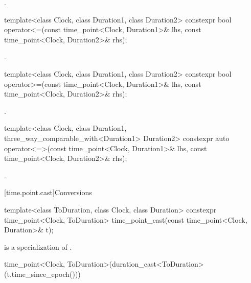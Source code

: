 \begin{itemdescr}
\pnum
\returns
{}.
\end{itemdescr}

%
\begin{itemdecl}
template<class Clock, class Duration1, class Duration2>
  constexpr bool operator<=(const time_point<Clock, Duration1>& lhs,
                            const time_point<Clock, Duration2>& rhs);
\end{itemdecl}

\begin{itemdescr}
\pnum
\returns
{}.
\end{itemdescr}

%
\begin{itemdecl}
template<class Clock, class Duration1, class Duration2>
  constexpr bool operator>=(const time_point<Clock, Duration1>& lhs,
                            const time_point<Clock, Duration2>& rhs);
\end{itemdecl}

\begin{itemdescr}
\pnum
\returns
{}.
\end{itemdescr}

%
\begin{itemdecl}
template<class Clock, class Duration1,
         three_way_comparable_with<Duration1> Duration2>
  constexpr auto operator<=>(const time_point<Clock, Duration1>& lhs,
                             const time_point<Clock, Duration2>& rhs);
\end{itemdecl}

\begin{itemdescr}
\pnum
\returns
{}.
\end{itemdescr}

[time.point.cast]{Conversions}

%
%
\begin{itemdecl}
template<class ToDuration, class Clock, class Duration>
  constexpr time_point<Clock, ToDuration> time_point_cast(const time_point<Clock, Duration>& t);
\end{itemdecl}

\begin{itemdescr}
\pnum
\constraints
{} is a specialization of .

\pnum
\returns
\begin{codeblock}
time_point<Clock, ToDuration>(duration_cast<ToDuration>(t.time_since_epoch()))
\end{codeblock}
\end{itemdescr}

